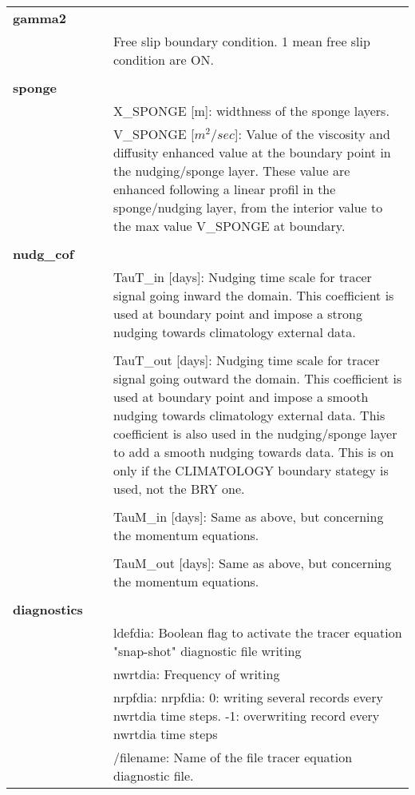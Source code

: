 \begin{longtable}{|p{0.25\linewidth}|p{0.75\linewidth}|}
\large{\textbf{gamma2}} &     \\ 
&  Free slip boundary condition. 1 mean free slip condition are ON. \\
&  \\ 
\large{\textbf{sponge}} &     \\
&     X\_SPONGE [m]: widthness of the sponge layers.\\
&     V\_SPONGE [$m^2/sec$]: Value of the viscosity and diffusity enhanced value at
the boundary point in the nudging/sponge layer. These value are enhanced following a
linear profil in the sponge/nudging layer, from the interior value to the max value
V\_SPONGE at boundary.\\
&  \\ 

\large{\textbf{nudg\_cof}} &     \\
& TauT\_in  [days]: Nudging time scale for tracer signal going inward the
domain. This coefficient is used at boundary point and impose a
strong nudging towards climatology external data.  \\
& \\
& TauT\_out [days]: Nudging time scale for tracer signal going outward the domain. This coefficient is used at boundary point and impose a
smooth nudging towards climatology external data. This coefficient is also used in
the nudging/sponge layer to add a smooth nudging towards data. This is on only if the
CLIMATOLOGY boundary stategy is used, not the BRY one.\\
& \\
& TauM\_in  [days]: Same as above, but concerning the momentum equations. \\
& \\
& TauM\_out [days]: Same as above, but concerning the momentum equations. \\
&  \\ 

\large{\textbf{diagnostics}} &     \\
&ldefdia: Boolean flag to activate the tracer equation "snap-shot" diagnostic file writing \\
&nwrtdia: Frequency of writing     \\
&nrpfdia: nrpfdia: 0: writing several records every nwrtdia time steps. -1: overwriting record
every nwrtdia time steps   \\
&/filename: Name of the file tracer equation diagnostic file.\\


\end{longtable}
